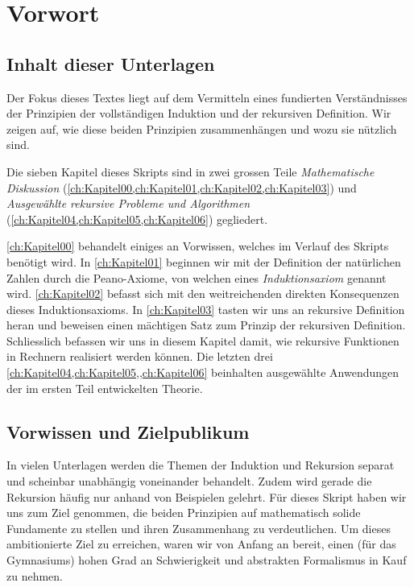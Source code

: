 \chapter*{Vorwort}
 
\section*{Inhalt dieser Unterlagen}
Der Fokus dieses Textes liegt auf dem Vermitteln eines fundierten Verständnisses der Prinzipien der vollständigen Induktion und der rekursiven Definition. Wir zeigen auf, wie diese beiden Prinzipien zusammenhängen und wozu sie nützlich sind.

Die sieben Kapitel dieses Skripts sind in zwei grossen Teile \textit{Mathematische Diskussion} (\cref{ch:Kapitel00,ch:Kapitel01,ch:Kapitel02,ch:Kapitel03}) und \textit{Ausgewählte rekursive Probleme und Algorithmen} (\cref{ch:Kapitel04,ch:Kapitel05,ch:Kapitel06}) gegliedert. 

\cref{ch:Kapitel00} behandelt einiges an Vorwissen, welches im Verlauf des Skripts benötigt wird. In \cref{ch:Kapitel01} beginnen wir mit der Definition der natürlichen Zahlen durch die Peano-Axiome, von welchen eines \textit{Induktionsaxiom} genannt wird. \cref{ch:Kapitel02} befasst sich mit den weitreichenden direkten Konsequenzen dieses Induktionsaxioms. In \cref{ch:Kapitel03} tasten wir uns an rekursive Definition heran und beweisen einen mächtigen Satz zum Prinzip der rekursiven Definition. Schliesslich befassen wir uns in diesem Kapitel damit, wie rekursive Funktionen in Rechnern realisiert werden können. Die letzten drei \cref{ch:Kapitel04,ch:Kapitel05,,ch:Kapitel06} beinhalten ausgewählte Anwendungen der im ersten Teil entwickelten Theorie.

\section*{Vorwissen und Zielpublikum}
In vielen Unterlagen werden die Themen der Induktion und Rekursion separat und scheinbar unabhängig voneinander behandelt. Zudem wird gerade die Rekursion häufig nur anhand von Beispielen gelehrt. Für dieses Skript haben wir uns zum Ziel genommen, die beiden Prinzipien auf mathematisch solide Fundamente zu stellen und ihren Zusammenhang zu verdeutlichen. Um dieses ambitionierte Ziel zu erreichen, waren wir von Anfang an bereit, einen (für das Gymnasiums) hohen Grad an Schwierigkeit und abstrakten Formalismus in Kauf zu nehmen.


